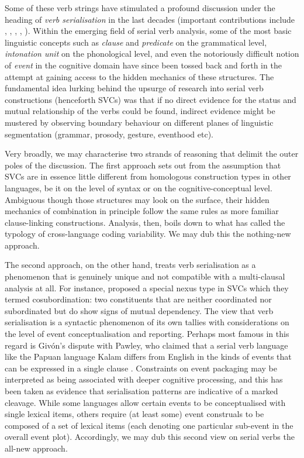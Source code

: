 Some of these verb strings have stimulated a profound discussion under the heading of \emph{verb serialisation} in the last decades (important contributions include \citealt{sebba1987syntax}, \citealt{Durie1997}, \citealt{Aikhenvald2006}, \citealt{foley2010events}, \citealt{haspelmath2016serial}). Within the emerging field of serial verb analysis, some of the most basic linguistic concepts such as \emph{clause} and \emph{predicate} on the grammatical level, \emph{intonation unit} on the phonological level, and even the notoriously difficult notion of \emph{event} in the cognitive domain have since been tossed back and forth in the attempt at gaining access to the hidden mechanics of these structures. The fundamental idea lurking behind the upsurge of research into serial verb constructions (henceforth SVCs) was that if no direct evidence for the status and mutual relationship of the verbs could be found, indirect evidence might be mustered by observing boundary behaviour on different planes of linguistic segmentation (grammar, prosody, gesture, eventhood etc). 

Very broadly, we may characterise two strands of reasoning that delimit the outer poles of the discussion. The first approach sets out from the assumption that SVCs are in essence little different from homologous construction types in other languages, be it on the level of syntax or on the cognitive-conceptual level. Ambiguous though those structures may look on the surface, their hidden mechanics of combination in principle follow the same rules as more familiar clause-linking constructions. Analysis, then, boils down to what \citet{givon1991serial} has called the typology of cross-language coding variability. We may dub this the nothing-new approach. 

The second approach, on the other hand, treats verb serialisation as a phenomenon that is genuinely unique and not compatible with a multi-clausal analysis at all. For instance, \citet{foley1984functional} proposed a special nexus type in SVCs which they termed cosubordination: two constituents that are neither coordinated nor subordinated but do show signs of mutual dependency. The view that verb serialisation is a syntactic phenomenon of its own tallies with considerations on the level of event conceptualisation and reporting. Perhaps most famous in this regard is Givón's dispute with Pawley, who claimed that a serial verb language like the Papuan language Kalam differs from English in the kinds of events that can be expressed in a single clause \citep{Pawley1987, pawley2011event}. Constraints on event packaging may be interpreted as being associated with deeper cognitive processing, and this has been taken as evidence that serialisation patterns are indicative of a marked cleavage. While some languages  allow certain events to be conceptualised with single lexical items, others require (at least some) event construals to be composed of a set of lexical items (each denoting one particular sub-event in the overall event plot). Accordingly, we may dub this second view on serial verbs the all-new approach.

